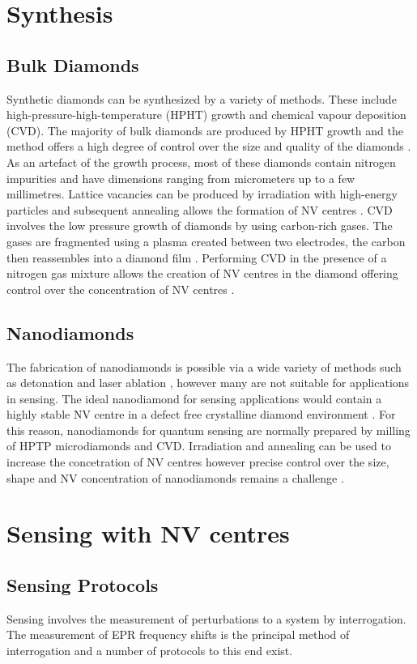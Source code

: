 \documentclass[10pt]{article}
\begin{document}
\begin{multicols}{2}
\section{Synthesis}
\subsection{Bulk Diamonds}
Synthetic diamonds can be synthesized by a variety of methods. These include high-pressure-high-temperature (HPHT) growth and chemical vapour deposition (CVD). The majority of bulk diamonds are produced by HPHT growth and the method offers a high degree of control over the size and quality of the diamonds \cite{wu2016diamond}. As an artefact of the growth process, most of these diamonds contain nitrogen impurities and have dimensions ranging from micrometers up to a few millimetres. Lattice vacancies can be produced by irradiation with high-energy particles and subsequent annealing allows the formation of NV centres \cite{wu2016diamond}. CVD involves the low pressure growth of diamonds by using carbon-rich gases. The gases are fragmented using a plasma created between two electrodes, the carbon then reassembles into a diamond film \cite{wu2016diamond}. Performing CVD in the presence of a nitrogen gas mixture allows the creation of NV centres in the diamond offering control over the concentration of NV centres \cite{wu2016diamond}. 

\subsection{Nanodiamonds}
The fabrication of nanodiamonds is possible via a wide variety of methods such as detonation \cite{shenderova2012ultrananocrystalline}and laser ablation \cite{amans2009nanodiamond}, however many are not suitable for applications in sensing. The ideal nanodiamond for sensing applications would contain a highly stable NV centre in a defect free crystalline diamond environment \cite{wu2016diamond}. For this reason, nanodiamonds for quantum sensing are normally prepared by milling of HPTP microdiamonds and CVD. Irradiation and annealing can be used to increase the concetration of NV centres however precise control over the size, shape and NV concentration of nanodiamonds remains a challenge \cite{wu2016diamond}. 
\section{Sensing with NV centres}

\subsection{Sensing Protocols}
Sensing involves the measurement of perturbations to a system by interrogation. The measurement of EPR frequency shifts is the principal method of interrogation and a number of protocols to this end exist. 


\end{multicols}
\end{document}

